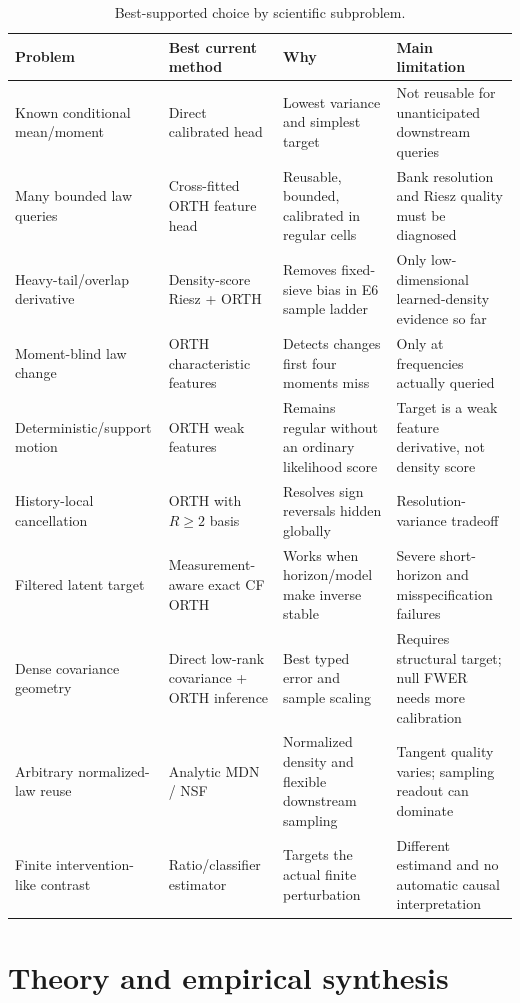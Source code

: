\documentclass[10.5pt]{article}
\begin{document}
\begin{table}[t]
\centering
\footnotesize
\renewcommand{\arraystretch}{1.14}
\caption{Best-supported choice by scientific subproblem.}
\begin{tabularx}{\textwidth}{@{}p{3.0cm}p{2.75cm}p{2.7cm}Y@{}}
\toprule
Problem & Best current method & Why & Main limitation \\
\midrule
Known conditional mean/moment & Direct calibrated head & Lowest variance and simplest target & Not reusable for unanticipated downstream queries \\
Many bounded law queries & Cross-fitted ORTH feature head & Reusable, bounded, calibrated in regular cells & Bank resolution and Riesz quality must be diagnosed \\
Heavy-tail/overlap derivative & Density-score Riesz + ORTH & Removes fixed-sieve bias in E6 sample ladder & Only low-dimensional learned-density evidence so far \\
Moment-blind law change & ORTH characteristic features & Detects changes first four moments miss & Only at frequencies actually queried \\
Deterministic/support motion & ORTH weak features & Remains regular without an ordinary likelihood score & Target is a weak feature derivative, not density score \\
History-local cancellation & ORTH with $R\ge2$ basis & Resolves sign reversals hidden globally & Resolution-variance tradeoff \\
Filtered latent target & Measurement-aware exact CF ORTH & Works when horizon/model make inverse stable & Severe short-horizon and misspecification failures \\
Dense covariance geometry & Direct low-rank covariance + ORTH inference & Best typed error and sample scaling & Requires structural target; null FWER needs more calibration \\
Arbitrary normalized-law reuse & Analytic MDN / NSF & Normalized density and flexible downstream sampling & Tangent quality varies; sampling readout can dominate \\
Finite intervention-like contrast & Ratio/classifier estimator & Targets the actual finite perturbation & Different estimand and no automatic causal interpretation \\
\bottomrule
\end{tabularx}
\end{table}

\section{Theory and empirical synthesis}
\end{document}
